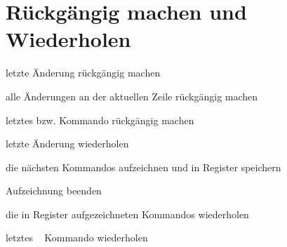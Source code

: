 \documentclass
[
  draft    = true,
  fontsize = 11pt,
  parskip  = half,
  BCOR     = 0pt,
  DIV      = calc,
  ngerman
]
{scrartcl}
\begin{document}
\section{Rückgängig machen und Wiederholen}
\begin{mytemize}
  \item {}   letzte Änderung rückgängig machen
  \item {} alle Änderungen an der aktuellen Zeile rückgängig machen
  \item {} letztes  bzw.  Kommando rückgängig machen
  \item {}   letzte Änderung wiederholen
  \item {}  die nächsten Kommandos aufzeichnen und in Register  speichern
  \item {}   Aufzeichnung beenden
  \item {}  die in Register  aufgezeichneten Kommandos wiederholen
  \item {}  letztes ~ Kommando wiederholen
\end{mytemize}

\end{document}
